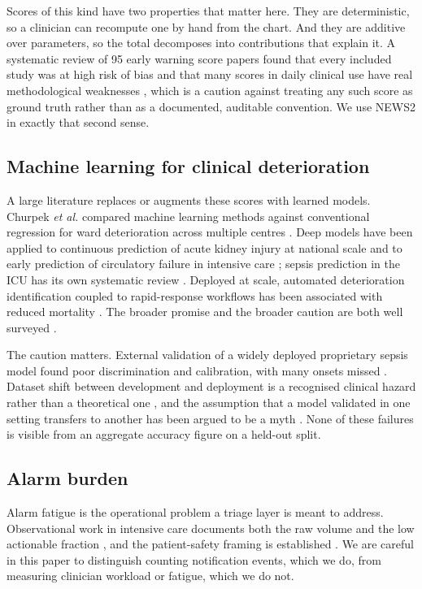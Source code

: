 \documentclass[lettersize,journal]{IEEEtran}
\begin{document}
Scores of this kind have two properties that matter here. They are
deterministic, so a clinician can recompute one by hand from the chart. And they
are additive over parameters, so the total decomposes into contributions that
explain it. A systematic review of 95 early warning score papers found that
every included study was at high risk of bias and that many scores in daily
clinical use have real methodological weaknesses \cite{gerry2020}, which is a
caution against treating any such score as ground truth rather than as a
documented, auditable convention. We use NEWS2 in exactly that second sense.

\subsection{Machine learning for clinical deterioration}

A large literature replaces or augments these scores with learned models.
Churpek \emph{et al.} compared machine learning methods against conventional
regression for ward deterioration across multiple centres \cite{churpek2016}.
Deep models have been applied to continuous prediction of acute kidney injury at
national scale \cite{tomasev2019} and to early prediction of circulatory failure
in intensive care \cite{hyland2020}; sepsis prediction in the ICU has its own
systematic review \cite{moor2021}. Deployed at scale, automated deterioration
identification coupled to rapid-response workflows has been associated with
reduced mortality \cite{escobar2020}. The broader promise and the broader
caution are both well surveyed \cite{topol2019}.

The caution matters. External validation of a widely deployed proprietary sepsis
model found poor discrimination and calibration, with many onsets missed
\cite{wong2021}. Dataset shift between development and deployment is a
recognised clinical hazard rather than a theoretical one \cite{finlayson2021},
and the assumption that a model validated in one setting transfers to another
has been argued to be a myth \cite{futoma2020}. None of these failures is
visible from an aggregate accuracy figure on a held-out split.

\subsection{Alarm burden}

Alarm fatigue is the operational problem a triage layer is meant to address.
Observational work in intensive care documents both the raw volume and the low
actionable fraction \cite{drew2014}, and the patient-safety framing is
established \cite{sendelbach2013}. We are careful in this paper to distinguish
counting notification events, which we do, from measuring clinician workload or
fatigue, which we do not.
\end{document}
